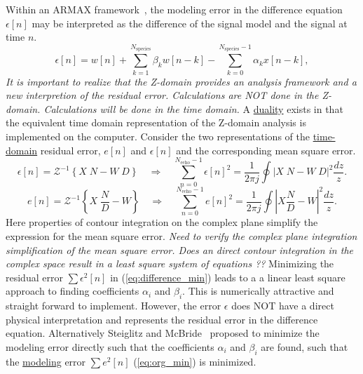 \documentclass[10pt]{amsart}
\begin{document}
Within an ARMAX framework~\cite{candy2005model}, the modeling error in the
difference equation $\epsilon[n]$ may be interpreted as the difference
of the signal model and the signal at time $n$.
\begin{equation}
	\epsilon[n] = w[n] + \sum\limits_{k=1}^{N_\text{species}} \beta_k w[n-k] - \sum\limits_{k=0}^{N_\text{species}-1} \alpha_k x[n-k],
\end{equation}
\textit{\color{red} It is important to realize that the Z-domain provides an analysis framework 
and a new interpretion of the residual error. Calculations are NOT done in
the Z-domain. Calculations will be done in the time domain.} A \underline{duality} exists
in that the equivalent time domain representation of the Z-domain analysis
is implemented on the computer. Consider the two representations of the
\underline{time-domain} residual error, $e[n]$ and $\epsilon[n]$ and the 
corresponding mean square error.
\begin{equation}
\epsilon[n] =  \mathcal{Z}^{-1}\left\{X \;N - W \;D \right\}   
\quad \Rightarrow \quad
\sum_{n=0}^{N_\text{echo}-1} \epsilon[n]^2 = \frac{1}{2 \pi j} \oint \left| X \;N - W \;D \right|^2 \frac{dz}{z}.
\label{eq:difference_min}
\end{equation}
\begin{equation}
e[n]        =  \mathcal{Z}^{-1}\left\{X \;\frac{N}{D} - W \right\}   
\quad \Rightarrow \quad
\sum_{n=0}^{N_\text{echo}-1} e[n]^2 = \frac{1}{2 \pi j} \oint \left| X \frac{N}{D} - W \right|^2 \frac{dz}{z}.
\label{eq:org_min}
\end{equation}
Here properties of contour integration on the complex plane simplify the
expression for the mean square error. 
\textit{\color{red}  Need to verify the complex plane integration
simplification of the mean square error.
Does an direct
contour integration in the complex space result in a least square system of equations ??}
Minimizing the residual error $\sum \epsilon^2[n]$ in (\ref{eq:difference_min}) leads to a
a linear least square approach to finding coefficients $\alpha_i$ and
$\beta_i$. This is numerically  attractive and straight forward to
implement.
However, the error $\epsilon$ does NOT have a direct physical interpretation
and represents the residual error in the difference equation.
Alternatively Steiglitz and McBride~\cite{Steiglitz65} proposed to minimize the 
modeling error directly such that 
the coefficients $\alpha_i$ and $\beta_i$ are
found, such that the \underline{modeling} error $\sum e^2[n]$ (\ref{eq:org_min}) is minimized.   
\end{document}
